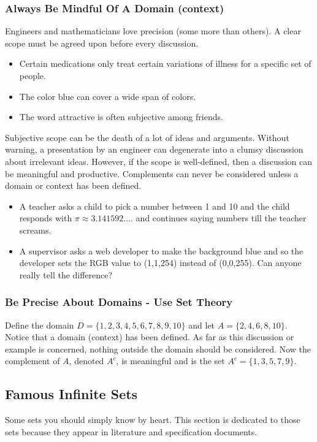 \subsubsection*{Always Be Mindful Of A Domain (context)}
Engineers and mathematicians love precision (some more than others).  A clear scope must be agreed upon before every discussion.  
\begin{itemize}
    \item Certain medications only treat certain variations of illness for a specific set of people.
    \item The color blue can cover a wide span of colors.
    \item The word attractive is often subjective among friends.
\end{itemize}
Subjective scope can be the death of a lot of ideas and arguments.  Without warning, a presentation by an engineer can degenerate into a clumsy discussion about irrelevant ideas.  However, if the scope is well-defined, then a discussion can be meaningful and productive.  Complements can never be considered unless a domain or context has been defined.

\begin{itemize}
    \item A teacher asks a child to pick a number between 1 and 10 and the child responds with $\pi \approx 3.141592....$ and continues saying numbers till the teacher screams.
    \item A supervisor asks a web developer to make the background blue and so the developer sets the RGB value to  (1,1,254) instead of (0,0,255). Can anyone really tell the difference?
\end{itemize}

\subsubsection*{Be Precise About Domains - Use Set Theory}
Define the domain $D = \{1,2,3,4,5,6,7,8,9,10\}$ and let $A = \{2,4,6,8,10\}$.  Notice that a domain (context) has been defined.  As far as this discussion or example is concerned, nothing outside the domain should be considered.  Now the complement of $A$, denoted $A^c$, is meaningful and is the set $A^c = \{1,3,5,7,9\}$.  
\newpage
\subsection*{Famous Infinite Sets}
Some sets you should simply know by heart.  This section is dedicated to those sets because they appear in literature and specification documents.

